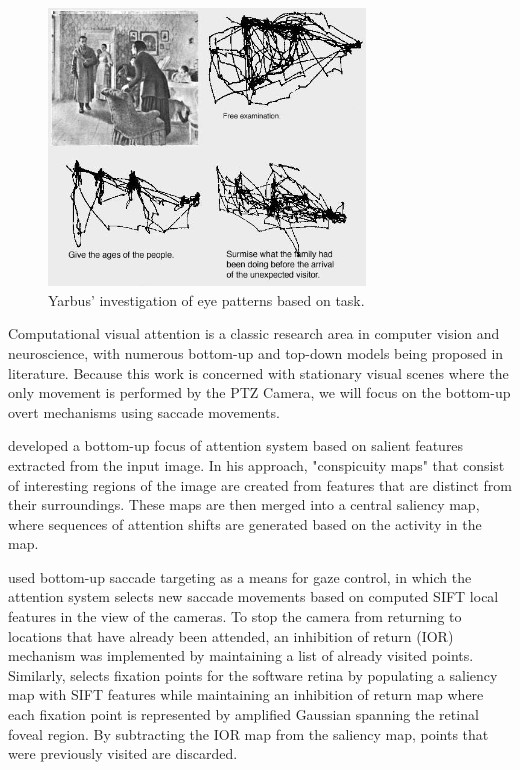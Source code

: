 \documentclass{l4proj}
\begin{document}
\begin{figure}[ht]
    \centering
    \includegraphics[width=0.75\textwidth]{l4template-master/images/Yarbus_The_Visitor.jpg}
    \caption{Yarbus' investigation of eye patterns based on task.}
    \label{Yarbus}
\end{figure}



Computational visual attention is a classic research area in computer vision and neuroscience, with numerous bottom-up and top-down models being proposed in literature. Because this work is concerned with stationary visual scenes where the only movement is performed by the PTZ Camera, we will focus on the bottom-up overt mechanisms using saccade movements. 


\citet{milanese1992} developed a bottom-up focus of attention system based on salient features extracted from the input image. In his approach, "conspicuity maps" that consist of interesting regions of the image are created from features that are distinct from their surroundings. These maps are then merged into a central saliency map, where sequences of attention shifts are generated based on the activity in the map. 

\citet{Fattah} used bottom-up saccade targeting as a means for gaze control, in which the attention system selects new saccade movements based on computed SIFT local features in the view of the cameras. To stop the camera from returning to locations that have already been attended, an inhibition of return (IOR) mechanism was implemented by maintaining a list of already  visited points. Similarly, \citet{Ozimek} selects fixation points for the software retina by populating a saliency map with SIFT features while maintaining an inhibition of return map where each fixation point is represented by amplified Gaussian spanning the retinal foveal region. By subtracting the IOR map from the saliency map, points that were previously visited are discarded. 
\end{document}

